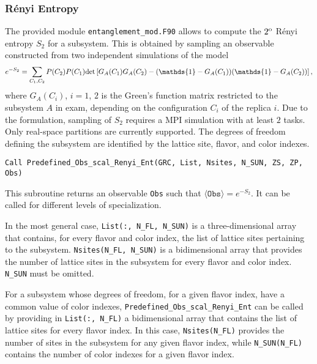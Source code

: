 %
\subsubsection{R{\'e}nyi Entropy}
\label{sec:renyi}
The provided module \texttt{entanglement\_mod.F90} allows to compute the $2^{\rm o}$ R\'enyi entropy $S_2$ for a subsystem.
This is obtained by sampling an observable constructed from two independent simulations of the model \cite{Grover13}
\begin{equation}
e^{-S_2} = \sum_{C_1,C_2} P(C_2) P(C_1) {\rm det}\left[G_A(C_1)G_A(C_2)-(\mathds{1} - G_A(C_1))(\mathds{1} - G_A(C_2))\right],
\label{renyi_obs}
\end{equation}
where $G_A(C_i)$, $i=1$, $2$ is the Green's function matrix restricted to the subsystem $A$ in exam, depending on the configuration $C_i$ of the replica $i$.
Due to the formulation, sampling of $S_2$ requires a MPI simulation with at least $2$ tasks.
Only real-space partitions are currently supported.
The degrees of freedom defining the subsystem are identified by the lattice site, flavor, and color indexes.

\begin{lstlisting}[style=fortran]
Call Predefined_Obs_scal_Renyi_Ent(GRC, List, Nsites, N_SUN, ZS, ZP, Obs)
\end{lstlisting}
This subroutine returns an observable \texttt{Obs} such that $\langle\texttt{Obs}\rangle=e^{-S_2}$.
It can be called for different levels of specialization.

In the most general case, \texttt{List(:, N\_FL, N\_SUN)} is a three-dimensional array that contains, for every flavor and color index, the list of lattice sites pertaining to the subsystem. \texttt{Nsites(N\_FL, N\_SUN)} is a bidimensional array that provides the number of lattice sites in the subsystem for every flavor and color index. \texttt{N\_SUN} must be omitted.

For a subsystem whose degrees of freedom, for a given flavor index, have a common value of color indexes, \texttt{Predefined\_Obs\_scal\_Renyi\_Ent} can be called by providing in \texttt{List(:, N\_FL)} a bidimensional array that contains the list of lattice sites for every flavor index. In this case, \texttt{Nsites(N\_FL)} provides the number of sites in the subsystem for any given flavor index, while \texttt{N\_SUN(N\_FL)} contains the number of color indexes for a given flavor index.

